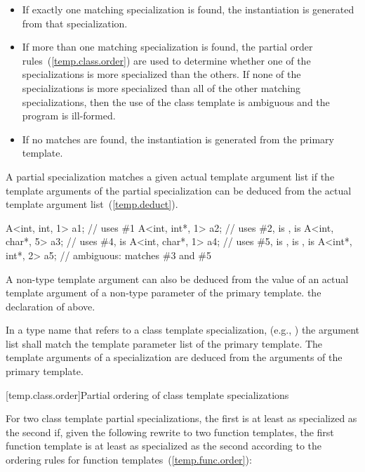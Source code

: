 \begin{itemize}
\item
If exactly one matching specialization is found, the instantiation is
generated from that specialization.
\item
If more than one matching specialization is found,
the partial order rules~(\ref{temp.class.order}) are used to determine
whether one of the specializations is more specialized than the
others.
If none of the specializations is more specialized than all of the
other matching specializations, then the use of the class template
is ambiguous and the program is ill-formed.
\item
If no matches are found, the instantiation is generated from the
primary template.
\end{itemize}

\pnum
A partial specialization matches a given actual template argument
list if the template arguments of the partial specialization can be
deduced from the actual template argument list~(\ref{temp.deduct}).
\enterexample

\begin{codeblock}
A<int, int, 1>   a1;            // uses \#1
A<int, int*, 1>  a2;            // uses \#2,  is ,  is 
A<int, char*, 5> a3;            // uses \#4,  is 
A<int, char*, 1> a4;            // uses \#5,  is ,  is ,  is 
A<int*, int*, 2> a5;            // ambiguous: matches \#3 and \#5
\end{codeblock}
\exitexample

\pnum
A non-type template argument can also be deduced from the value of an actual
template argument of a non-type parameter of the primary template.
\enterexample
the declaration of
above.
\exitexample

\pnum
In a type name that refers to a class template specialization, (e.g.,
)
the argument list shall match the template parameter list of the primary
template.
The template arguments of a specialization are deduced from the arguments
of the primary template.

[temp.class.order]{Partial ordering of class template specializations}

\pnum
For two class template partial specializations,
the first is at least as specialized as the second if, given the following
rewrite to two function templates, the first function template is at least
as specialized as the second according to the ordering rules for function
templates~(\ref{temp.func.order}):

